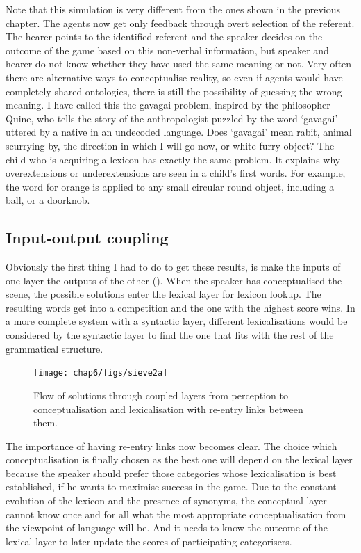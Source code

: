 Note that this simulation is very different from the 
ones shown in the previous chapter. The agents now get 
only feedback through overt selection of the referent. 
The hearer points to the identified referent and the speaker 
decides on the outcome of the game based on this 
non-verbal information, but speaker and hearer do not 
know whether they have used the same meaning or not. 
Very often there are alternative ways
to conceptualise reality, so even if agents would have
completely shared ontologies, there is still the possibility 
of guessing the wrong meaning. I have called this
the gavagai-problem, inspired by the philosopher
Quine, who tells the story of the anthropologist 
puzzled by the word `gavagai' uttered by a native 
in an undecoded language. Does `gavagai' mean rabit, animal 
scurrying by, the direction in which I will go 
now, or white furry object? 
The child who is acquiring a lexicon has
exactly the same problem. It explains why 
overextensions or underextensions
are seen in a child's first words. For example, 
the word for orange is applied to any small circular round 
object, including a ball, or a doorknob.

\subsection{Input-output coupling}

Obviously the first thing I had to do to get 
these results, is make the inputs of one layer the
outputs of the other (). When the 
speaker has conceptualised the scene, the possible
solutions enter the lexical layer for lexicon lookup. 
The resulting words get into a competition and the 
one with the highest score wins. In a more complete
system with a syntactic layer, different lexicalisations
would be considered by the syntactic layer to find 
the one that fits with the rest of the grammatical 
structure. 


\begin{figure}[htbp]
  \centerline{\texttt{[image: chap6/figs/sieve2a]}}
\caption{\label{sieve2a} Flow of solutions through 
coupled layers from perception to conceptualisation and lexicalisation with re-entry links between them.} 
\end{figure}

The importance of having re-entry links now becomes
clear. The choice which conceptualisation is finally chosen 
as the best one will depend on the lexical layer because 
the speaker should prefer those categories whose 
lexicalisation is best established, if he wants to 
maximise success in the game. Due to the constant evolution
of the lexicon and the presence of synonyms, the conceptual
layer cannot know once and for all what the most
appropriate conceptualisation from the viewpoint of 
language will be. And it needs to know the outcome of the
lexical layer to later update the scores of participating
categorisers. 

